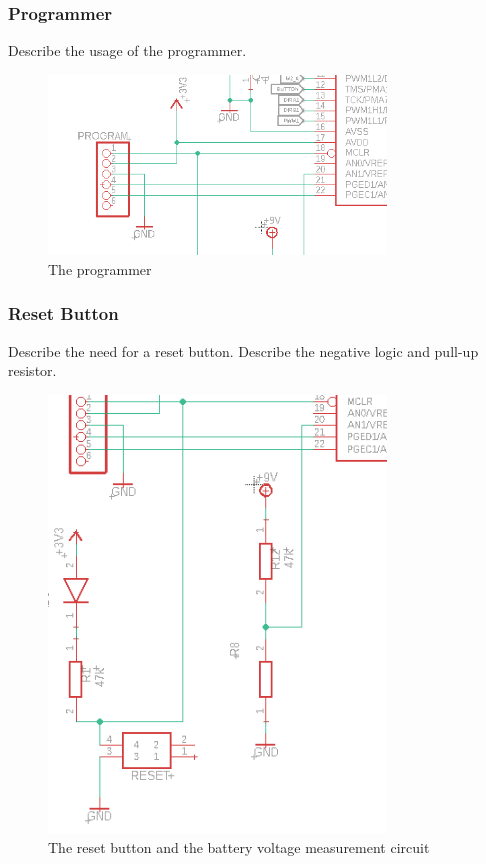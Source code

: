 \vspace{1cm}

\subsubsection{Programmer}

Describe the usage of the programmer.

\begin{figure}[htb]
    \centering
    \includegraphics[width=0.8\textwidth]{figures/hardware/Programmer.PNG}
    \caption{The programmer}
    \label{fig:programmer}
\end{figure}

\FloatBarrier


\subsubsection{Reset Button}

Describe the need for a reset button.
Describe the negative logic and pull-up resistor.

\begin{figure}[htb]
    \centering
    \includegraphics[width=0.8\textwidth]{figures/hardware/MCLRandBatteryMeasurement.PNG}
    \caption{The reset button and the battery voltage measurement circuit}
    \label{fig:reset}
\end{figure}

